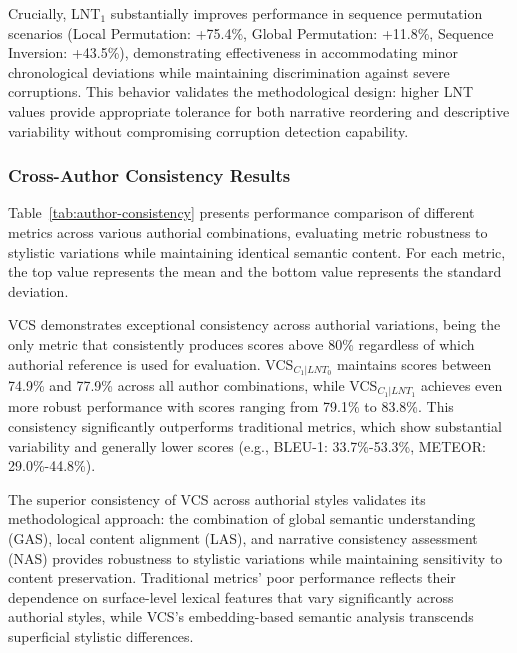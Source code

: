 \documentclass[main.tex]{subfiles}
\begin{document}
Crucially, LNT$_1$ substantially improves performance in sequence permutation scenarios (Local Permutation: +75.4\%, Global Permutation: +11.8\%, Sequence Inversion: +43.5\%), demonstrating effectiveness in accommodating minor chronological deviations while maintaining discrimination against severe corruptions. This behavior validates the methodological design: higher LNT values provide appropriate tolerance for both narrative reordering and descriptive variability without compromising corruption detection capability.

\subsubsection{Cross-Author Consistency Results}

Table~\ref{tab:author-consistency} presents performance comparison of different metrics across various authorial combinations, evaluating metric robustness to stylistic variations while maintaining identical semantic content. For each metric, the top value represents the mean and the bottom value represents the standard deviation.

VCS demonstrates exceptional consistency across authorial variations, being the only metric that consistently produces scores above 80\% regardless of which authorial reference is used for evaluation. VCS$_{C_1|LNT_0}$ maintains scores between 74.9\% and 77.9\% across all author combinations, while VCS$_{C_1|LNT_1}$ achieves even more robust performance with scores ranging from 79.1\% to 83.8\%. This consistency significantly outperforms traditional metrics, which show substantial variability and generally lower scores (e.g., BLEU-1: 33.7\%-53.3\%, METEOR: 29.0\%-44.8\%).

The superior consistency of VCS across authorial styles validates its methodological approach: the combination of global semantic understanding (GAS), local content alignment (LAS), and narrative consistency assessment (NAS) provides robustness to stylistic variations while maintaining sensitivity to content preservation. Traditional metrics' poor performance reflects their dependence on surface-level lexical features that vary significantly across authorial styles, while VCS's embedding-based semantic analysis transcends superficial stylistic differences.
\end{document}
